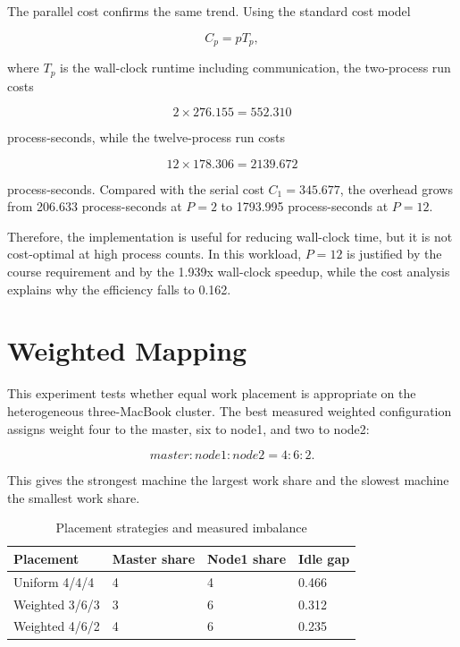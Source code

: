 The parallel cost confirms the same trend. Using the standard cost model

\[
C_p = pT_p,
\]

where $T_p$ is the wall-clock runtime including communication, the two-process run costs

\[
2 \times 276.155 = 552.310
\]

process-seconds, while the twelve-process run costs

\[
12 \times 178.306 = 2139.672
\]

process-seconds. Compared with the serial cost $C_1 = 345.677$, the overhead grows from 206.633 process-seconds at $P = 2$ to 1793.995 process-seconds at $P = 12$.

Therefore, the implementation is useful for reducing wall-clock time, but it is not cost-optimal at high process counts. In this workload, $P = 12$ is justified by the course requirement and by the 1.939x wall-clock speedup, while the cost analysis explains why the efficiency falls to 0.162.


\section{Weighted Mapping}\label{sec:weighted-mapping}

This experiment tests whether equal work placement is appropriate on the heterogeneous three-MacBook cluster. The best measured weighted configuration assigns weight four to the master, six to node1, and two to node2:

\[
master : node1 : node2 = 4 : 6 : 2.
\]

This gives the strongest machine the largest work share and the slowest machine the smallest work share.

\begin{table}[H]
\centering
\caption{Placement strategies and measured imbalance}
\label{tab:weighted-mapping}
\small
\begin{tabularx}{\textwidth}{L{3.0cm} C{2.2cm} C{2.2cm} C{2.0cm}}
\toprule
Placement & Master share & Node1 share & Idle gap \\
\midrule
Uniform 4/4/4 & 4 & 4 & 0.466 \\
Weighted 3/6/3 & 3 & 6 & 0.312 \\
Weighted 4/6/2 & 4 & 6 & 0.235 \\
\bottomrule
\end{tabularx}
\end{table}


